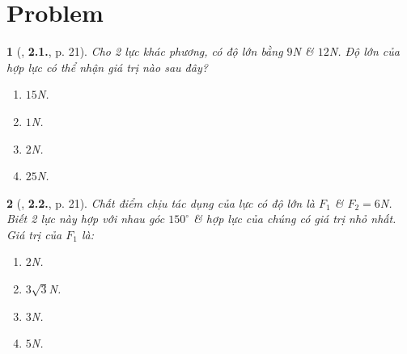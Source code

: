 \documentclass{article}
\newtheorem{baitoan}{}
\begin{document}
\section{Problem}

\begin{baitoan}[\cite{Giang_Hang_Trung_ncpt_Vat_Ly_10}, \textbf{2.1.}, p. 21]
	Cho 2 lực khác phương, có độ lớn bằng $9$\emph{N} \& $12$\emph{N}. Độ lớn của hợp lực có thể nhận giá trị nào sau đây?
	\begin{enumerate}
		\item[{\rm\sf A.}] $15$\emph{N}.
		\item[{\rm\sf B.}] $1$\emph{N}.
		\item[{\rm\sf C.}] $2$\emph{N}.
		\item[{\rm\sf D.}] $25$\emph{N}.
	\end{enumerate}
\end{baitoan}

\begin{baitoan}[\cite{Giang_Hang_Trung_ncpt_Vat_Ly_10}, \textbf{2.2.}, p. 21]
	Chất điểm chịu tác dụng của lực có độ lớn là $F_1$ \& $F_2 = 6$\emph{N}. Biết 2 lực này hợp với nhau góc $150^\circ$ \& hợp lực của chúng có giá trị nhỏ nhất. Giá trị của $F_1$ là: 
	\begin{enumerate}
		\item[{\rm\sf A.}] $2$\emph{N}.
		\item[{\rm\sf B.}] $3\sqrt{3}$\emph{N}.
		\item[{\rm\sf C.}] $3$\emph{N}.
		\item[{\rm\sf D.}] $5$\emph{N}.
	\end{enumerate}
\end{baitoan}


\printbibliography[heading=bibintoc]
	
\end{document}
